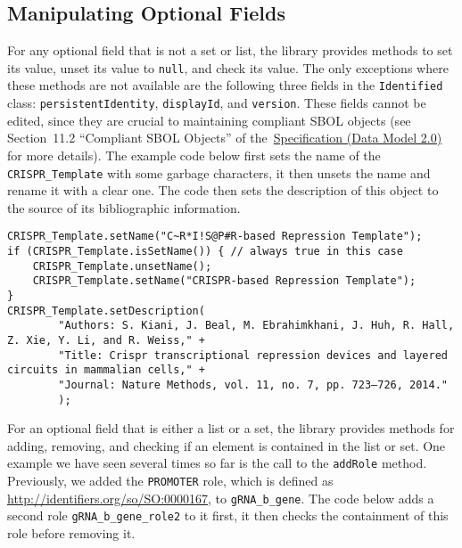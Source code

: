 \subsection*{Manipulating Optional Fields}
For any optional field that is not a set or list, the library provides methods to set its value, unset its value to \lstinline+null+, and check its value. The only exceptions where these methods are not available are the following three fields in the \lstinline+Identified+ class: \lstinline+persistentIdentity+, \lstinline+displayId+, and
\lstinline+version+.  These fields cannot be edited, since they are crucial to maintaining
compliant SBOL objects (see Section~11.2 ``Compliant SBOL Objects'' of the~\href{http://sbolstandard.org/downloads/specification-data-model-2-0/}{Specification
  (Data Model 2.0)} for more details).  The example code below first sets the name of the \lstinline+CRISPR_Template+  with some garbage characters, it then unsets the name and rename it with a clear one. The code then sets the description of this object to the source of its bibliographic information. 

\vspace{\abovedisplayskip}
\begin{minipage}{0.95\textwidth} 
\begin{lstlisting}
CRISPR_Template.setName("C~R*I!S@P#R-based Repression Template");
if (CRISPR_Template.isSetName()) { // always true in this case
	CRISPR_Template.unsetName();
	CRISPR_Template.setName("CRISPR-based Repression Template");
}
CRISPR_Template.setDescription(
        "Authors: S. Kiani, J. Beal, M. Ebrahimkhani, J. Huh, R. Hall, Z. Xie, Y. Li, and R. Weiss," + 
        "Title: Crispr transcriptional repression devices and layered circuits in mammalian cells," + 
        "Journal: Nature Methods, vol. 11, no. 7, pp. 723–726, 2014."
        );
\end{lstlisting}
\end{minipage}

For an optional field that is either a list or a set, the library provides methods for adding, removing, and checking if an element is contained in the list or set. One example we have seen several times so far is the call to the \lstinline+addRole+ method. Previously, we added the \lstinline+PROMOTER+ role, which is defined as \url{http://identifiers.org/so/SO:0000167}, to \lstinline+gRNA_b_gene+. The code below adds a second role \lstinline+gRNA_b_gene_role2+ to it first, it then checks the containment of this role before removing it. 

